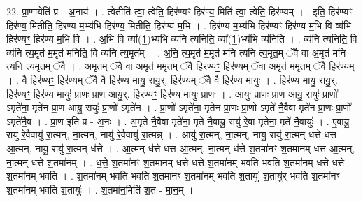 \documentclass[17pt]{extarticle}
\begin{document}
22. प्रा॒णायेति॑ प्र - अ॒नाय॑ । . त्वेतीति॑ त्वा॒ त्वेति॒ हिर॑ण्यꣳ॒॒ हिर॑ण्य॒ मिति॑ त्वा॒ त्वेति॒ हिर॑ण्यम् । . इति॒ हिर॑ण्यꣳ॒॒ हिर॑ण्य॒ मितीति॒ हिर॑ण्य म॒भ्य॑भि हिर॑ण्य॒ मितीति॒ हिर॑ण्य म॒भि । . हिर॑ण्य म॒भ्य॑भि हिर॑ण्यꣳ॒॒ हिर॑ण्य म॒भि वि व्य॑भि हिर॑ण्यꣳ॒॒ हिर॑ण्य म॒भि वि । . अ॒भि वि व्या᳚(1॒)भ्य॑भि व्य॑नि त्यनिति॒ व्या᳚(1॒)भ्य॑भि व्य॑निति । . व्य॑नि त्यनिति॒ वि व्य॑नि त्य॒मृत॑ म॒मृत॑ मनिति॒ वि व्य॑नि त्य॒मृत᳚म् । . अ॒नि॒ त्य॒मृत॑ म॒मृत॑ मनि त्यनि त्य॒मृत॒म् ॅवै वा अ॒मृत॑ मनि त्यनि त्य॒मृत॒म् ॅवै । . अ॒मृत॒म् ॅवै वा अ॒मृत॑ म॒मृत॒म् ॅवै हिर॑ण्यꣳ॒॒ हिर॑ण्य॒म् ॅवा अ॒मृत॑ म॒मृत॒म् ॅवै हिर॑ण्यम् । . वै हिर॑ण्यꣳ॒॒ हिर॑ण्य॒म् ॅवै वै हिर॑ण्य॒ मायु॒ रायु॒र्॒. हिर॑ण्य॒म् ॅवै वै हिर॑ण्य॒ मायुः॑ । . हिर॑ण्य॒ मायु॒ रायु॒र्॒. हिर॑ण्यꣳ॒॒ हिर॑ण्य॒ मायुः॑ प्रा॒णः प्रा॒ण आयु॒र्॒. हिर॑ण्यꣳ॒॒ हिर॑ण्य॒ मायुः॑ प्रा॒णः । . आयुः॑ प्रा॒णः प्रा॒ण आयु॒ रायुः॑ प्रा॒णो॑ ऽमृते॑ना॒ मृते॑न प्रा॒ण आयु॒ रायुः॑ प्रा॒णो॑ ऽमृते॑न । . प्रा॒णो॑ ऽमृते॑ना॒ मृते॑न प्रा॒णः प्रा॒णो॑ ऽमृते॑ नै॒वैवा मृते॑न प्रा॒णः प्रा॒णो॑ ऽमृते॑नै॒व । . प्रा॒ण इति॑ प्र - अ॒नः । . अ॒मृते॑ नै॒वैवा मृते॑ना॒ मृते॑ नै॒वायु॒ रायु॑ रे॒वा मृते॑ना॒ मृते॑ नै॒वायुः॑ । . ए॒वायु॒ रायु॑ रे॒वैवायु॑ रा॒त्मन्, ना॒त्मन्, नायु॑ रे॒वैवायु॑ रा॒त्मन्न् । . आयु॑ रा॒त्मन्, ना॒त्मन्, नायु॒ रायु॑ रा॒त्मन् ध॑त्ते धत्त आ॒त्मन्, नायु॒ रायु॑ रा॒त्मन् ध॑त्ते । . आ॒त्मन् ध॑त्ते धत्त आ॒त्मन्, ना॒त्मन् ध॑त्ते श॒तमा॑नꣳ श॒तमा॑नम् धत्त आ॒त्मन्, ना॒त्मन् ध॑त्ते श॒तमा॑नम् । . ध॒त्ते॒ श॒तमा॑नꣳ श॒तमा॑नम् धत्ते धत्ते श॒तमा॑नम् भवति भवति श॒तमा॑नम् धत्ते धत्ते श॒तमा॑नम् भवति । . श॒तमा॑नम् भवति भवति श॒तमा॑नꣳ श॒तमा॑नम् भवति श॒तायुः॑ श॒तायु॑र् भवति श॒तमा॑नꣳ श॒तमा॑नम् भवति श॒तायुः॑ । . श॒तमा॑न॒मिति॑ श॒त - मा॒न॒म् । \newline
\end{document}
